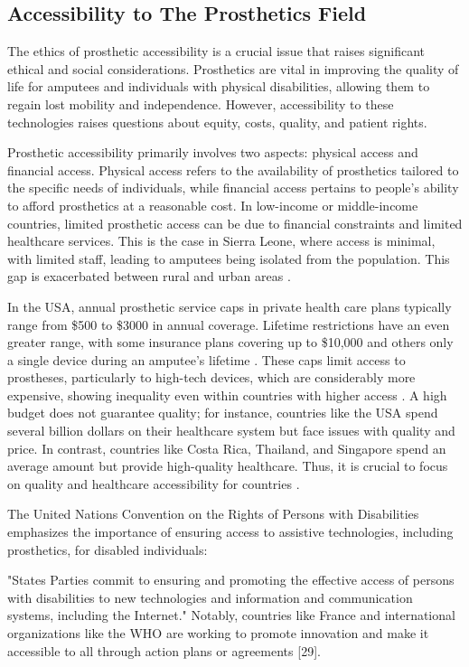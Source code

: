 \subsection{Accessibility to The Prosthetics Field}
The ethics of prosthetic accessibility is a crucial issue that raises significant ethical and social considerations. Prosthetics are vital in improving the quality of life for amputees and individuals with physical disabilities, allowing them to regain lost mobility and independence. However, accessibility to these technologies raises questions about equity, costs, quality, and patient rights.

Prosthetic accessibility primarily involves two aspects: physical access and financial access. Physical access refers to the availability of prosthetics tailored to the specific needs of individuals, while financial access pertains to people's ability to afford prosthetics at a reasonable cost. In low-income or middle-income countries, limited prosthetic access can be due to financial constraints and limited healthcare services. This is the case in Sierra Leone, where access is minimal, with limited staff, leading to amputees being isolated from the population. This gap is exacerbated between rural and urban areas \cite{noauthor_experiences_nodate}.

In the USA, annual prosthetic service caps in private health care plans typically range from \$500 to \$3000 in annual coverage. Lifetime restrictions have an even greater range, with some insurance plans covering up to \$10,000 and others only a single device during an amputee’s lifetime \cite{mitka_advocates_2008}. These caps limit access to prostheses, particularly to high-tech devices, which are considerably more expensive, showing inequality even within countries with higher access \cite{etter_prescription_2015}. A high budget does not guarantee quality; for instance, countries like the USA spend several billion dollars on their healthcare system but face issues with quality and price. In contrast, countries like Costa Rica, Thailand, and Singapore spend an average amount but provide high-quality healthcare. Thus, it is crucial to focus on quality and healthcare accessibility for countries \cite{ranabhat_sustainable_2023}.

The United Nations Convention on the Rights of Persons with Disabilities emphasizes the importance of ensuring access to assistive technologies, including prosthetics, for disabled individuals:

"States Parties commit to ensuring and promoting the effective access of persons with disabilities to new technologies and information and communication systems, including the Internet." Notably, countries like France and international organizations like the WHO are working to promote innovation and make it accessible to all through action plans or agreements \cite{noauthor_lindicateur_nodate}[29]\cite{noauthor_who_nodate}\cite{noauthor_promouvoir_nodate}.

